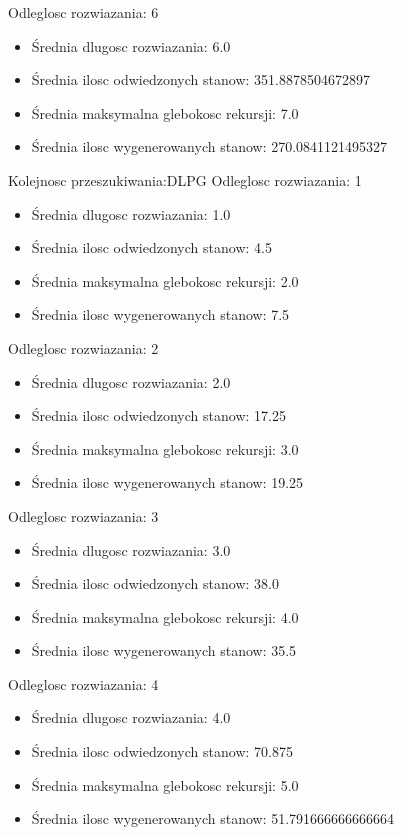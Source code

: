 \documentclass{classrep}
\begin{document}
				Odleglosc rozwiazania: 6
				\begin{itemize}
					\item Średnia dlugosc rozwiazania: 6.0
					\item Średnia ilosc odwiedzonych stanow: 351.8878504672897
					\item Średnia maksymalna glebokosc rekursji: 7.0
					\item Średnia ilosc wygenerowanych stanow: 270.0841121495327
				\end{itemize}
				
				Kolejnosc przeszukiwania:DLPG
				Odleglosc rozwiazania: 1
				\begin{itemize}
					\item Średnia dlugosc rozwiazania: 1.0
					\item Średnia ilosc odwiedzonych stanow: 4.5
					\item Średnia maksymalna glebokosc rekursji: 2.0
					\item Średnia ilosc wygenerowanych stanow: 7.5
				\end{itemize}
				Odleglosc rozwiazania: 2
				\begin{itemize}
					\item Średnia dlugosc rozwiazania: 2.0
					\item Średnia ilosc odwiedzonych stanow: 17.25
					\item Średnia maksymalna glebokosc rekursji: 3.0
					\item Średnia ilosc wygenerowanych stanow: 19.25
				\end{itemize}
				Odleglosc rozwiazania: 3
				\begin{itemize}
					\item Średnia dlugosc rozwiazania: 3.0
					\item Średnia ilosc odwiedzonych stanow: 38.0
					\item Średnia maksymalna glebokosc rekursji: 4.0
					\item Średnia ilosc wygenerowanych stanow: 35.5
				\end{itemize}
				Odleglosc rozwiazania: 4
				\begin{itemize}
					\item Średnia dlugosc rozwiazania: 4.0
					\item Średnia ilosc odwiedzonych stanow: 70.875
					\item Średnia maksymalna glebokosc rekursji: 5.0
					\item Średnia ilosc wygenerowanych stanow: 51.791666666666664
				\end{itemize}
\end{document}
